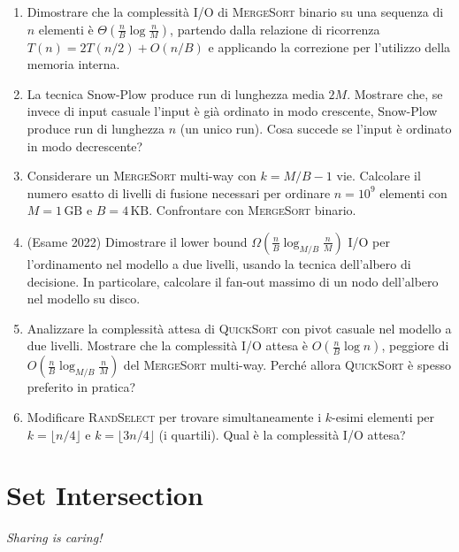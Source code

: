 \documentclass[12pt, a4paper, oneside]{book}
\theoremstyle{plain}
\theoremstyle{definition}
\theoremstyle{remark}
\begin{document}
\begin{enumerate}
  \item Dimostrare che la complessità I/O di \textsc{MergeSort} binario su una sequenza di $n$ elementi è $\Theta\!\left(\frac{n}{B}\log\frac{n}{M}\right)$, partendo dalla relazione di ricorrenza $T(n) = 2T(n/2) + O(n/B)$ e applicando la correzione per l'utilizzo della memoria interna.

  \item La tecnica Snow-Plow produce run di lunghezza media $2M$. Mostrare che, se invece di input casuale l'input è già ordinato in modo crescente, Snow-Plow produce run di lunghezza $n$ (un unico run). Cosa succede se l'input è ordinato in modo decrescente?

  \item Considerare un \textsc{MergeSort} multi-way con $k = M/B - 1$ vie. Calcolare il numero esatto di livelli di fusione necessari per ordinare $n = 10^9$ elementi con $M = 1\,\text{GB}$ e $B = 4\,\text{KB}$. Confrontare con \textsc{MergeSort} binario.

  \item (Esame 2022) Dimostrare il lower bound $\Omega\!\left(\frac{n}{B}\log_{M/B}\frac{n}{M}\right)$ I/O per l'ordinamento nel modello a due livelli, usando la tecnica dell'albero di decisione. In particolare, calcolare il fan-out massimo di un nodo dell'albero nel modello su disco.

  \item Analizzare la complessità attesa di \textsc{QuickSort} con pivot casuale nel modello a due livelli. Mostrare che la complessità I/O attesa è $O\!\left(\frac{n}{B}\log n\right)$, peggiore di $O\!\left(\frac{n}{B}\log_{M/B}\frac{n}{M}\right)$ del \textsc{MergeSort} multi-way. Perché allora \textsc{QuickSort} è spesso preferito in pratica?

  \item Modificare \textsc{RandSelect} per trovare simultaneamente i $k$-esimi elementi per $k = \lfloor n/4\rfloor$ e $k = \lfloor 3n/4\rfloor$ (i quartili). Qual è la complessità I/O attesa?
\end{enumerate}

\chapter{Set Intersection}

\begin{flushright}
\itshape Sharing is caring!
\end{flushright}
\end{document}
